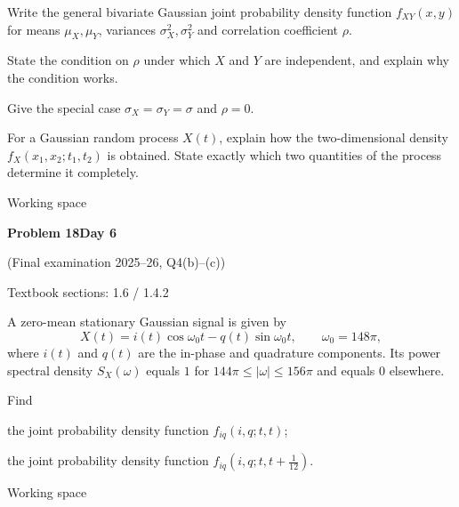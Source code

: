 \documentclass[11pt]{article}
\newcommand{\qtitle}[2]{\clearpage\begin{tcolorbox}[colback=navy,colframe=navy,arc=1.5pt,boxrule=0pt]\color{white}\large\bfseries #1\hfill\small #2\end{tcolorbox}}
\begin{document}
\begin{tcolorbox}[colback=qbg,colframe=qbg,boxrule=0pt]\begin{qparts}
  \item Write the general bivariate Gaussian joint probability density function $f_{XY}(x,y)$ for
        means $\mu_X,\mu_Y$, variances $\sigma_X^{2},\sigma_Y^{2}$ and correlation coefficient $\rho$.
  \item State the condition on $\rho$ under which $X$ and $Y$ are independent, and explain why
        the condition works.
  \item Give the special case $\sigma_X=\sigma_Y=\sigma$ and $\rho=0$.
  \item For a Gaussian random process $X(t)$, explain how the two-dimensional density
        $f_X(x_1,x_2;t_1,t_2)$ is obtained. State exactly which two quantities of the process
        determine it completely.
\end{qparts}\end{tcolorbox}\smallskip\begin{workspace}\hfill{\color{linec}\footnotesize Working space}\end{workspace}
\qtitle{Problem 18}{Day 6}
{\small\color{accentred}(Final examination 2025--26, Q4(b)--(c))}\par\smallskip
{\small\color{muted}Textbook sections: 1.6 / 1.4.2}\par\medskip
\begin{tcolorbox}[colback=qbg,colframe=qbg,boxrule=0pt]A zero-mean stationary Gaussian signal is given by
\[
X(t)=i(t)\cos\omega_0 t-q(t)\sin\omega_0 t,\qquad \omega_0=148\pi ,
\]
where $i(t)$ and $q(t)$ are the in-phase and quadrature components. Its power spectral density
$S_X(\omega)$ equals $1$ for $144\pi\le|\omega|\le156\pi$ and equals $0$ elsewhere.
\begin{center}
\end{center}
Find
\begin{qparts}
  \item the joint probability density function $f_{iq}(i,q;t,t)$;
  \item the joint probability density function $f_{iq}\!\left(i,q;t,t+\tfrac{1}{12}\right)$.
\end{qparts}\end{tcolorbox}\smallskip\begin{workspace}\hfill{\color{linec}\footnotesize Working space}\end{workspace}
\end{document}

